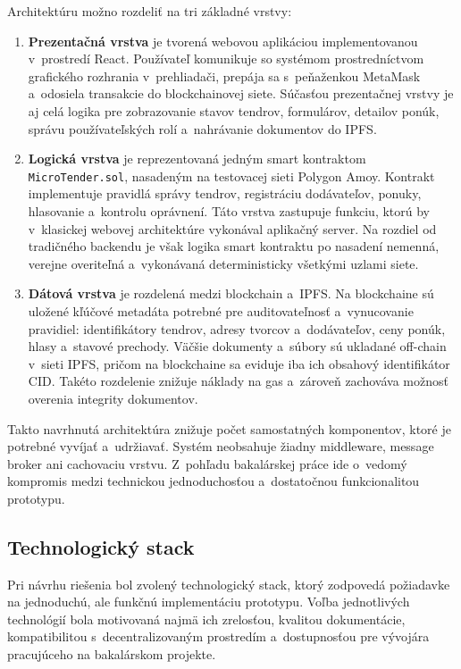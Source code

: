Architektúru možno rozdeliť na tri základné vrstvy:
\begin{enumerate}
    \item \textbf{Prezentačná vrstva} je tvorená webovou aplikáciou
    implementovanou v~prostredí React. Používateľ komunikuje so systémom
    prostredníctvom grafického rozhrania v~prehliadači, prepája sa s~peňaženkou
    MetaMask a~odosiela transakcie do blockchainovej siete. Súčasťou
    prezentačnej vrstvy je aj celá logika pre zobrazovanie stavov tendrov,
    formulárov, detailov ponúk, správu používateľských rolí a~nahrávanie
    dokumentov do IPFS.

    \item \textbf{Logická vrstva} je reprezentovaná jedným smart kontraktom
    \texttt{MicroTender.sol}, nasadeným na testovacej sieti Polygon Amoy.
    Kontrakt implementuje pravidlá správy tendrov, registráciu dodávateľov,
    ponuky, hlasovanie a~kontrolu oprávnení. Táto vrstva zastupuje funkciu,
    ktorú by v~klasickej webovej architektúre vykonával aplikačný server.
    Na rozdiel od tradičného backendu je však logika smart kontraktu po nasadení
    nemenná, verejne overiteľná a~vykonávaná deterministicky všetkými uzlami
    siete.

    \item \textbf{Dátová vrstva} je rozdelená medzi blockchain a~IPFS.
    Na blockchaine sú uložené kľúčové metadáta potrebné pre auditovateľnosť
    a~vynucovanie pravidiel: identifikátory tendrov, adresy tvorcov a~dodávateľov,
    ceny ponúk, hlasy a~stavové prechody. Väčšie dokumenty a~súbory sú ukladané
    off-chain v~sieti IPFS, pričom na blockchaine sa eviduje iba ich obsahový
    identifikátor CID. Takéto rozdelenie znižuje náklady na gas a~zároveň
    zachováva možnosť overenia integrity dokumentov.
\end{enumerate}

Takto navrhnutá architektúra znižuje počet samostatných komponentov, ktoré je
potrebné vyvíjať a~udržiavať. Systém neobsahuje žiadny middleware, message
broker ani cachovaciu vrstvu. Z~pohľadu bakalárskej práce ide o~vedomý kompromis
medzi technickou jednoduchosťou a~dostatočnou funkcionalitou prototypu.

\subsection{Technologický stack}
\label{subsec:technology_stack}

Pri návrhu riešenia bol zvolený technologický stack, ktorý zodpovedá požiadavke
na jednoduchú, ale funkčnú implementáciu prototypu. Voľba jednotlivých
technológií bola motivovaná najmä ich zrelosťou, kvalitou dokumentácie,
kompatibilitou s~decentralizovaným prostredím a~dostupnosťou pre vývojára
pracujúceho na bakalárskom projekte.

